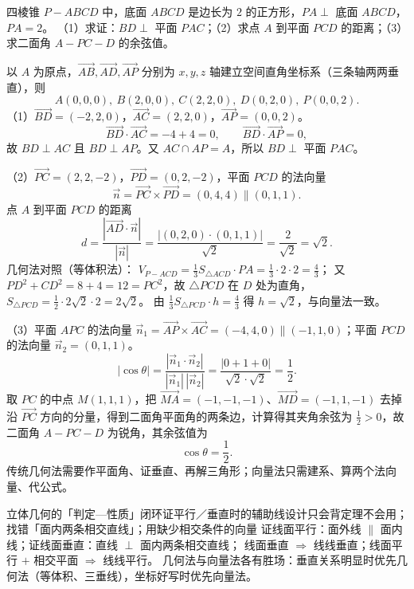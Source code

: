 \begin{explore}
\begin{example}
四棱锥 $P-ABCD$ 中，底面 $ABCD$ 是边长为 $2$ 的正方形，$PA\perp$ 底面 $ABCD$，$PA=2$。
（1）求证：$BD\perp$ 平面 $PAC$；（2）求点 $A$ 到平面 $PCD$ 的距离；（3）求二面角 $A-PC-D$ 的余弦值。
\end{example}
\begin{solution}
以 $A$ 为原点，$\overrightarrow{AB},\overrightarrow{AD},\overrightarrow{AP}$ 分别为 $x,y,z$ 轴建立空间直角坐标系（三条轴两两垂直），则
\[
  A(0,0,0),\ B(2,0,0),\ C(2,2,0),\ D(0,2,0),\ P(0,0,2).
\]
（1）$\overrightarrow{BD}=(-2,2,0)$，$\overrightarrow{AC}=(2,2,0)$，$\overrightarrow{AP}=(0,0,2)$。
\[
  \overrightarrow{BD}\cdot\overrightarrow{AC}=-4+4=0,\qquad
  \overrightarrow{BD}\cdot\overrightarrow{AP}=0,
\]
故 $BD\perp AC$ 且 $BD\perp AP$。又 $AC\cap AP=A$，所以 $BD\perp$ 平面 $PAC$。

（2）$\overrightarrow{PC}=(2,2,-2)$，$\overrightarrow{PD}=(0,2,-2)$，平面 $PCD$ 的法向量
\[
  \vec n=\overrightarrow{PC}\times\overrightarrow{PD}=(0,4,4)\parallel(0,1,1).
\]
点 $A$ 到平面 $PCD$ 的距离
\[
  d=\frac{|\overrightarrow{AD}\cdot\vec n|}{|\vec n|}
  =\frac{|(0,2,0)\cdot(0,1,1)|}{\sqrt2}=\frac{2}{\sqrt2}=\sqrt2.
\]
几何法对照（等体积法）：
$V_{P-ACD}=\frac13 S_{\triangle ACD}\cdot PA=\frac13\cdot2\cdot2=\frac43$；
又 $PD^2+CD^2=8+4=12=PC^2$，故 $\triangle PCD$ 在 $D$ 处为直角，$S_{\triangle PCD}=\frac12\cdot2\sqrt2\cdot2=2\sqrt2$。
由 $\frac13 S_{\triangle PCD}\cdot h=\frac43$ 得 $h=\sqrt2$，与向量法一致。

（3）平面 $APC$ 的法向量 $\vec n_1=\overrightarrow{AP}\times\overrightarrow{AC}=(-4,4,0)\parallel(-1,1,0)$；平面 $PCD$ 的法向量 $\vec n_2=(0,1,1)$。
\[
  |\cos\theta|=\frac{|\vec n_1\cdot\vec n_2|}{|\vec n_1|\,|\vec n_2|}
  =\frac{|0+1+0|}{\sqrt2\cdot\sqrt2}=\frac12.
\]
取 $PC$ 的中点 $M(1,1,1)$，把 $\overrightarrow{MA}=(-1,-1,-1)$、$\overrightarrow{MD}=(-1,1,-1)$ 去掉沿 $\overrightarrow{PC}$ 方向的分量，得到二面角平面角的两条边，计算得其夹角余弦为 $\frac12>0$，故二面角 $A-PC-D$ 为锐角，其余弦值为
\[
  \cos\theta=\frac12.
\]
传统几何法需要作平面角、证垂直、再解三角形；向量法只需建系、算两个法向量、代公式。
\end{solution}

\begin{conccard}[一级]{立体几何的「判定—性质」闭环}{证平行／垂直时的辅助线设计}{只会背定理不会用；找错「面内两条相交直线」；用缺少相交条件的向量}
证线面平行：面外线 $\parallel$ 面内线；证线面垂直：直线 $\perp$ 面内两条相交直线；
线面垂直 $\Rightarrow$ 线线垂直；线面平行 $+$ 相交平面 $\Rightarrow$ 线线平行。
几何法与向量法各有胜场：垂直关系明显时优先几何法（等体积、三垂线），坐标好写时优先向量法。
\end{conccard}


\end{explore}
